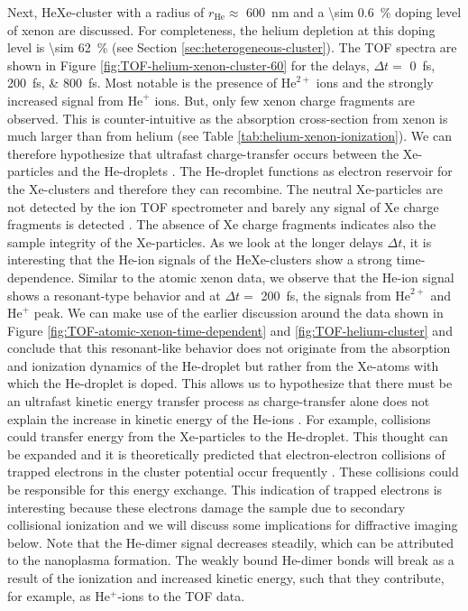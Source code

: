 Next, HeXe-cluster with a radius of $r_{\text{He}}\approx$ \SI{600}{\nano\meter} and a \SI{\sim 0.6}{\percent} doping level of xenon are discussed. For completeness, the helium depletion at this doping level is \SI{\sim 62}{\percent} (see Section \ref{sec:heterogeneous-cluster}). The TOF spectra are shown in Figure \ref{fig:TOF-helium-xenon-cluster-60} for the delays, $\Delta t=$ \SIlist{0;200;800}{\femto\second}. Most notable is the presence of $\text{He}^{2+}$ ions and the strongly increased signal from $\text{He}^{+}$ ions. But, only few xenon charge fragments are observed. This is counter-intuitive as the absorption cross-section from xenon is much larger than from helium (see Table \ref{tab:helium-xenon-ionization}). We can therefore hypothesize that ultrafast charge-transfer occurs between the Xe-particles and the He-droplets \cite{Hoener-2008-JPB}. The He-droplet functions as electron reservoir for the Xe-clusters and therefore they can recombine. The neutral Xe-particles are not detected by the ion TOF spectrometer and barely any signal of Xe charge fragments is detected \cite{Hoener-2008-JPB,Hau-Riege-2007-PRL}. The absence of Xe charge fragments indicates also the sample integrity of the Xe-particles. As we look at the longer delays $\Delta t$, it is interesting that the He-ion signals of the HeXe-clusters show a strong time-dependence. Similar to the atomic xenon data, we observe that the He-ion signal shows a resonant-type behavior and at $\Delta t =$ \SI{200}{\femto\second}, the signals from $\text{He}^{2+}$ and $\text{He}^{+}$ peak. We can make use of the earlier discussion around the data shown in Figure \ref{fig:TOF-atomic-xenon-time-dependent} and \ref{fig:TOF-helium-cluster} and conclude that this resonant-like behavior does not originate from the absorption and ionization dynamics of the He-droplet but rather from the Xe-atoms with which the He-droplet is doped. This allows us to hypothesize that there must be an ultrafast kinetic energy transfer process as charge-transfer alone does not explain the increase in kinetic energy of the He-ions \cite{Hoener-2008-JPB,Sugishima-2012-PRA,Muller-2015-JPhysB}. For example, collisions could transfer energy from the Xe-particles to the He-droplet. This thought can be expanded and it is theoretically predicted that electron-electron collisions of trapped electrons in the cluster potential occur frequently \cite{Arbeiter-2011-NJP}. These collisions could be responsible for this energy exchange. This indication of trapped electrons is interesting because these electrons damage the sample due to secondary collisional ionization \cite{Hau-Riege-2004-PRE} and we will discuss some implications for diffractive imaging below. Note that the He-dimer signal decreases steadily, which can be attributed to the nanoplasma formation. The weakly bound He-dimer bonds will break as a result of the ionization and increased kinetic energy, such that they contribute, for example, as He$^{+}$-ions to the TOF data.\\[1\baselineskip]
